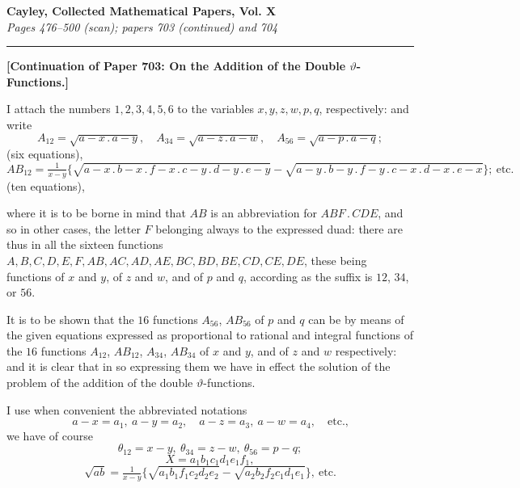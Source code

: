 \documentclass[11pt]{article}
\begin{document}
\begin{center}
\textbf{\large Cayley, Collected Mathematical Papers, Vol. X}\\[2pt]
\textit{Pages 476--500 (scan); papers 703 (continued) and 704}
\end{center}

\bigskip
\hrule
\bigskip

\noindent\textbf{[Continuation of Paper 703: On the Addition of the Double $\vartheta$-Functions.]}

\bigskip

I attach the numbers $1,2,3,4,5,6$ to the variables $x,y,z,w,p,q$, respectively: and write
\[
A_{12} = \sqrt{a-x\mathbin{.}a-y},\quad A_{34} = \sqrt{a-z\mathbin{.}a-w},\quad A_{56} = \sqrt{a-p\mathbin{.}a-q};
\]
(six equations),
\[
AB_{12} = \tfrac{1}{x-y}\bigl\{\sqrt{a-x\mathbin{.}b-x\mathbin{.}f-x\mathbin{.}c-y\mathbin{.}d-y\mathbin{.}e-y} - \sqrt{a-y\mathbin{.}b-y\mathbin{.}f-y\mathbin{.}c-x\mathbin{.}d-x\mathbin{.}e-x}\bigr\};\ \text{etc.}
\]
(ten equations),

where it is to be borne in mind that $AB$ is an abbreviation for $ABF\mathbin{.}CDE$, and so in other cases, the letter $F$ belonging always to the expressed duad: there are thus in all the sixteen functions $A,B,C,D,E,F,AB,AC,AD,AE,BC,BD,BE,CD,CE,DE$, these being functions of $x$ and $y$, of $z$ and $w$, and of $p$ and $q$, according as the suffix is $12$, $34$, or $56$.

It is to be shown that the $16$ functions $A_{56}$, $AB_{56}$ of $p$ and $q$ can be by means of the given equations expressed as proportional to rational and integral functions of the $16$ functions $A_{12}$, $AB_{12}$, $A_{34}$, $AB_{34}$ of $x$ and $y$, and of $z$ and $w$ respectively: and it is clear that in so expressing them we have in effect the solution of the problem of the addition of the double $\vartheta$-functions.

I use when convenient the abbreviated notations
\[
a-x = a_1,\ a-y = a_2,\quad a-z = a_3,\ a-w = a_4,\quad \text{etc.,}
\]
we have of course
\[
\theta_{12} = x-y,\ \theta_{34} = z-w,\ \theta_{56} = p-q;
\]
\[
X = a_1 b_1 c_1 d_1 e_1 f_1,
\]
\[
\sqrt{ab} = \tfrac{1}{x-y}\bigl\{\sqrt{a_1 b_1 f_1 c_2 d_2 e_2} - \sqrt{a_2 b_2 f_2 c_1 d_1 e_1}\bigr\},\ \text{etc.}
\]
\end{document}
